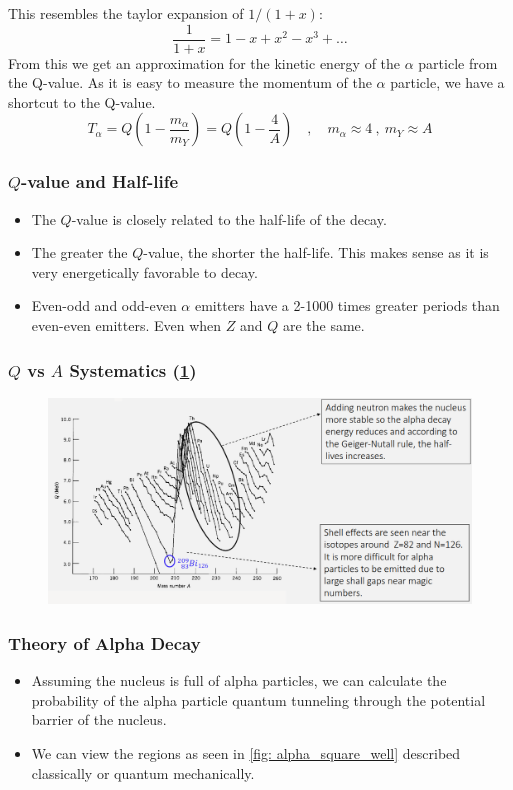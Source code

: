 This resembles the taylor expansion of $1/(1 + x)$:
\begin{equation}
  \frac{1}{1 + x} = 1 - x + x^2 - x^3 + \dots
\end{equation}
From this we get an approximation for the kinetic energy of the $\alpha$ particle from the Q-value. As it is easy to measure the momentum of the $α$ particle, we have a shortcut to the Q-value.
\begin{equation}
  T_{α} = Q\left(1 - \frac{m_{α}}{m_{Y}}\right) = Q\left(1 - \frac{4}{A}\right)\quad , \quad  m_{α} ≈ 4 \ , \ m_{Y} ≈ A
\end{equation}


\subsubsection{$Q$-value and Half-life}
\begin{itemize}
  \item The $Q$-value is closely related to the half-life of the decay.
  \item The greater the $Q$-value, the shorter the half-life. This makes sense as it is very energetically favorable to decay.
  \item Even-odd and odd-even $α$ emitters have a 2-1000 times greater periods than even-even emitters. Even when $Z$ and $Q$ are the same. 
\end{itemize}

\subsubsection{$Q$ vs $A$ Systematics (\cref{fig: Q_v_A_systematics})}
\begin{figure}[h!]
\centering
\includegraphics[width = .8\textwidth]{Q_v_A_systematics.png}
\caption{}
\label{fig: Q_v_A_systematics}
\end{figure}

\subsubsection{Theory of Alpha Decay}
\begin{itemize}
  \item Assuming the nucleus is full of alpha particles, we can calculate the probability of the alpha particle quantum tunneling through the potential barrier of the nucleus.
  \item We can view the regions as seen in \cref{fig: alpha_square_well} described classically or quantum mechanically.
\end{itemize}

